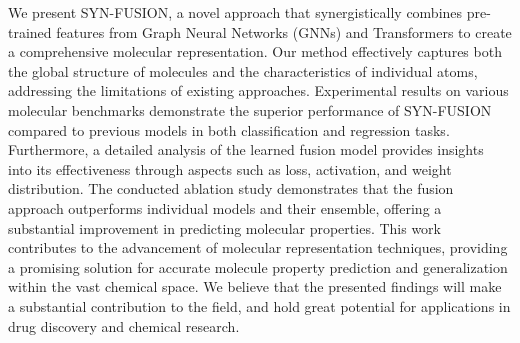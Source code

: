 \documentclass[sigconf,nonacm]{acmart}
\begin{document}
We present SYN-FUSION, a novel approach that synergistically combines pre-trained features from Graph Neural Networks (GNNs) and Transformers to create a comprehensive molecular representation. Our method effectively captures both the global structure of molecules and the characteristics of individual atoms, addressing the limitations of existing approaches.
Experimental results on various molecular benchmarks demonstrate the superior performance of SYN-FUSION compared to previous models in both classification and regression tasks. Furthermore, a detailed analysis of the learned fusion model provides insights into its effectiveness through aspects such as loss, activation, and weight distribution. The conducted ablation study demonstrates that the fusion approach outperforms individual models and their ensemble, offering a substantial improvement in predicting molecular properties.
This work contributes to the advancement of molecular representation techniques, providing a promising solution for accurate molecule property prediction and generalization within the vast chemical space. We believe that the presented findings will make a substantial contribution to the field, and hold great potential for applications in drug discovery and chemical research.
\end{document}
